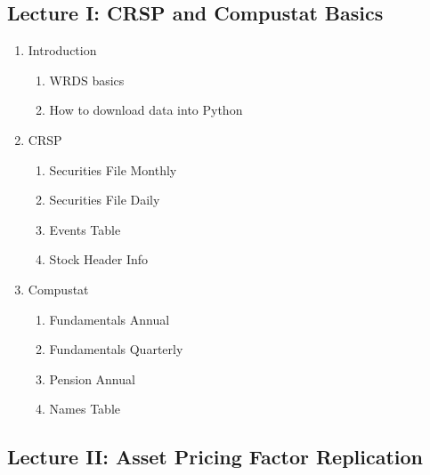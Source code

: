 \documentclass[12pts]{article}
\begin{document}
\subsection*{Lecture I: CRSP and Compustat Basics}
\begin{enumerate}
	\item Introduction
\begin{enumerate}
		\item WRDS basics
		\item How to download data into Python
\end{enumerate}

\item{CRSP}
\begin{enumerate}
	\item Securities File Monthly 
	\item Securities File Daily 
	\item Events Table
	\item Stock Header Info
\end{enumerate}

\item Compustat
\begin{enumerate}
	\item Fundamentals Annual
	\item Fundamentals Quarterly
	\item Pension Annual
	\item Names Table 
\end{enumerate}
\end{enumerate}

\subsection*{Lecture II: Asset Pricing Factor Replication}
\end{document}
